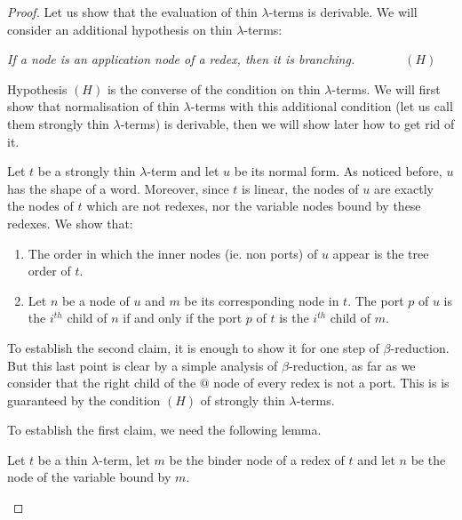 \begin{proof}
Let us show that the evaluation of thin $\lambda$-terms is derivable. We will consider an additional hypothesis on thin $\lambda$-terms:
\begin{center}
\textit{If a node is an application node of a redex, then it is branching.}$\qquad\qquad (H)$
\end{center}
Hypothesis $(H)$ is the converse of the condition on thin $\lambda$-terms. We will first show that normalisation of thin $\lambda$-terms with this additional condition (let us call them strongly thin $\lambda$-terms) is derivable, then we will show later how to get rid of it.

Let $t$ be a strongly thin $\lambda$-term and let $u$ be its normal form. As noticed before, $u$ has the shape of a word. Moreover, since $t$ is linear, the nodes of $u$ are exactly the nodes of $t$ which are not redexes, nor the variable nodes bound by these redexes. We show that:
\noindent \begin{enumerate}
\item The order in which the inner nodes (ie. non ports) of $u$ appear is the tree order of $t$.
\item Let $n$ be a node of $u$ and $m$ be its corresponding node in $t$. The port $p$ of $u$ is the $i^{th}$ child of $n$ if and only if the port $p$ of $t$ is the $i^{th}$ child of $m$.  
\end{enumerate} 

To establish the second claim, it is enough to show it for one step of $\beta$-reduction. But this last point is clear by a simple analysis of $\beta$-reduction, as far as we consider that the right child of the $@$ node of every redex is not a port. This is is guaranteed by the condition $(H)$ of strongly thin $\lambda$-terms. 


To establish the first claim, we need the following lemma.
\begin{lemma}\label{lem:internalLemma}
Let $t$ be a thin $\lambda$-term, let $m$ be the binder node of a redex of $t$ and let $n$ be the node of the variable bound by $m$.


\end{lemma}
\end{proof}
